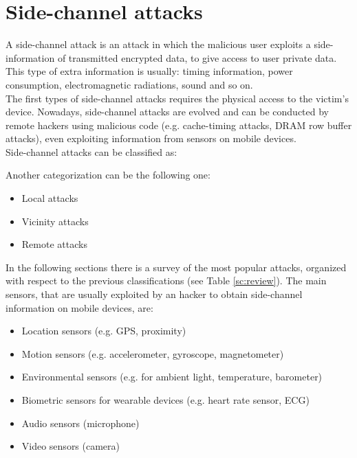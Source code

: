 \chapter{Side-channel attacks}\label{chapter:SideCH}
A side-channel attack is an attack in which the malicious user exploits a side-information of transmitted encrypted data, to give access to user private data. 
This type of extra information is usually: timing information, power consumption, electromagnetic radiations, sound and so on.\\
The first types of side-channel attacks requires the physical access to the victim's device. Nowadays, side-channel attacks are evolved and can be conducted by remote hackers using malicious code (e.g. cache-timing attacks, DRAM row buffer attacks), even exploiting information from sensors on mobile devices\cite{side_classification}.\\
Side-channel attacks can be classified as:
\begin{itemize}
\end{itemize}
Another categorization can be the following one:
\begin{itemize}
\item{Local attacks}
\item{Vicinity attacks}
\item{Remote attacks}
\end{itemize}
In the following sections there is a survey of the most popular attacks, organized with respect to the previous classifications (see Table \ref{sc:review}). 
The main sensors, that are usually exploited by an hacker to obtain side-channel information on mobile devices, are\cite{side_attacks}:
\begin{itemize}
\item{Location sensors (e.g. GPS, proximity)}
\item{Motion sensors (e.g. accelerometer, gyroscope, magnetometer)}
\item{Environmental sensors (e.g. for ambient light, temperature, barometer)}
\item{Biometric sensors for wearable devices (e.g. heart rate sensor, ECG)}
\item{Audio sensors (microphone)}
\item{Video sensors (camera)}
\end{itemize}

